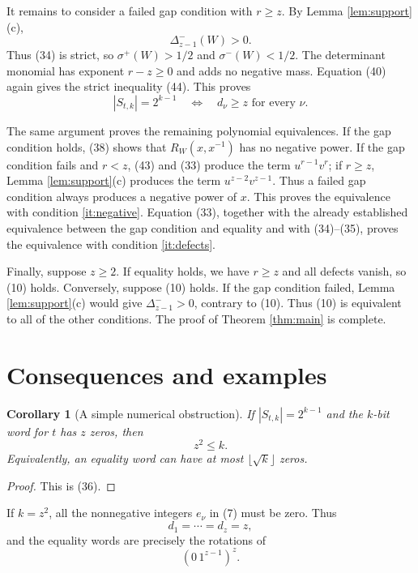 \documentclass[10pt,a4paper]{article}
\newtheorem{corollary}[theorem]{Corollary}
\begin{document}
It remains to consider a failed gap condition with $r\geq z$.  By
Lemma \ref{lem:support}(c),
\[
                         \Delta_{z-1}^-(W)>0.
\]
Thus (34) is strict, so $\sigma^+(W)>1/2$ and
$\sigma^-(W)<1/2$.  The determinant monomial has exponent
$r-z\geq0$ and adds no negative mass.  Equation (40) again gives the
strict inequality (44).  This proves
\[
 |S_{t,k}|=2^{k-1}
 \quad\Longleftrightarrow\quad
 d_\nu\geq z\text{ for every }\nu.                          \tag{45}
\]

The same argument proves the remaining polynomial equivalences.  If
the gap condition holds, (38) shows that $R_W(x,x^{-1})$ has no
negative power.  If the gap condition fails and $r<z$, (43) and (33)
produce the term $u^{r-1}v^r$; if $r\geq z$, Lemma
\ref{lem:support}(c) produces the term $u^{z-2}v^{z-1}$.
Thus a failed gap condition always produces a negative power of $x$.
This proves the equivalence with condition \ref{it:negative}.
Equation (33), together with the already established equivalence between
the gap condition and equality and with (34)--(35), proves the equivalence
with condition \ref{it:defects}.

Finally, suppose $z\geq2$.  If equality holds, we have $r\geq z$ and
all defects vanish, so (10) holds.  Conversely, suppose (10) holds.
If the gap condition failed, Lemma \ref{lem:support}(c) would give
$\Delta_{z-1}^->0$, contrary to (10).  Thus (10) is equivalent to all
of the other conditions.  The proof of Theorem \ref{thm:main} is
complete.


\section{Consequences and examples}

\begin{corollary}[A simple numerical obstruction]\label{cor:numerical}
If $|S_{t,k}|=2^{k-1}$ and the $k$-bit word for $t$ has $z$ zeros,
then
\[
                              z^2\leq k.                     \tag{46}
\]
Equivalently, an equality word can have at most $\lfloor\sqrt{k}\rfloor$
zeros.
\end{corollary}

\begin{proof}
This is (36).
\end{proof}

If $k=z^2$, all the nonnegative integers $e_\nu$ in (7) must be zero.
Thus
\[
                          d_1=\cdots=d_z=z,                  \tag{47}
\]
and the equality words are precisely the rotations of
\[
                          (0\,1^{z-1})^z.                    \tag{48}
\]
\end{document}
